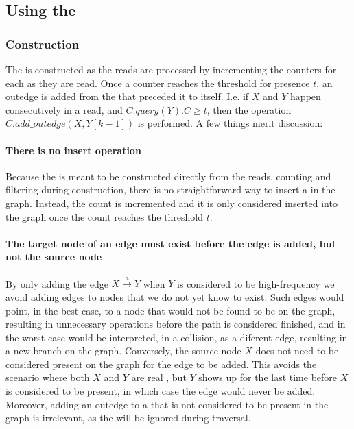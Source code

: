 \subsection{Using the \dBCM}

\subsubsection{Construction}
\label{subsubsec:dbcm-construction}

The \dBCM is constructed as the reads are processed by incrementing the counters for each \kmer as they are read. Once a  counter reaches the threshold for presence $t$, an outedge is added from the \kmer that preceded it to itself. I.e. if  $X$ and $Y$ happen consecutively in a read, and $C.\mathit{query}(Y).C \geq t$, then the operation $C.\mathit{add\_outedge}(X, Y[k-1])$ is performed. A few things merit discussion:

\paragraph{There is no insert operation} Because the \dBCM is meant to be constructed directly from the reads, counting and filtering  during construction, there is no straightforward way to insert a \kmer in the graph. Instead, the  count is incremented and it is only considered inserted into the graph once the count reaches the threshold $t$.

\paragraph{The target node of an edge must exist before the edge is added, but not the source node} By only adding the edge $X\stackrel{a}{\longrightarrow}Y$ when $Y$ is considered to be high-frequency we avoid adding edges to nodes that we do not yet know to exist. Such edges would point, in the best case, to a node that would not be found to be on the graph, resulting in unnecessary operations before the path is considered finished, and in the worst case would be interpreted, in a collision, as a diferent edge, resulting in a new branch on the graph. Conversely, the source node $X$ does not need to be considered present on the graph for the edge to be added. This avoids the scenario where both $X$ and $Y$ are real , but $Y$ shows up for the last time before $X$ is considered to be present, in which case the edge would never be added. Moreover, adding an outedge to a \kmer that is not considered to be present in the graph is irrelevant, as the \kmer will be ignored during traversal.

